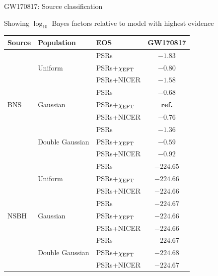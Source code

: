 \documentclass[usenames,dvipsnames,t]{beamer}
\begin{document}
\begin{frame}{GW170817: Source classification}

  Showing $\log_{10}$ Bayes factors relative to model with highest evidence

  \vspace{3mm}

  \begin{table}
    \centering
    \scriptsize
    \begin{tabular}{|l|l|l|c|}
    \hline
    \textbf{Source} & \textbf{Population} & \textbf{EOS} & \textbf{GW170817} \\
    \hline\hline
    \multirow{9}{*}{BNS} & \multirow{3}{*}{Uniform} & PSRs & \cellcolor{jeffreysred4}$-1.83$ \\
    \cline{3-4}
     &  & PSRs+$\chi_{\rm{EFT}}$ & \cellcolor{jeffreysred2}$-0.80$ \\
    \cline{3-4}
     &  & PSRs+NICER & \cellcolor{jeffreysred4}$-1.58$ \\
    \cline{2-4}
     & \multirow{3}{*}{Gaussian} & PSRs & \cellcolor{jeffreysred2}$-0.68$ \\
    \cline{3-4}
     &  & PSRs+$\chi_{\rm{EFT}}$ & \textbf{ref.} \\
    \cline{3-4}
     &  & PSRs+NICER & \cellcolor{jeffreysred2}$-0.76$ \\
    \cline{2-4}
     & \multirow{3}{*}{Double Gaussian} & PSRs & \cellcolor{jeffreysred3}$-1.36$ \\
    \cline{3-4}
     &  & PSRs+$\chi_{\rm{EFT}}$ & \cellcolor{jeffreysred2}$-0.59$ \\
    \cline{3-4}
     &  & PSRs+NICER & \cellcolor{jeffreysred2}$-0.92$ \\
    \hline\hline
    \multirow{9}{*}{NSBH} & \multirow{3}{*}{Uniform} & PSRs & \cellcolor{jeffreysred5}$-224.65$ \\
    \cline{3-4}
     &  & PSRs+$\chi_{\rm{EFT}}$ & \cellcolor{jeffreysred5}$-224.66$ \\
    \cline{3-4}
     &  & PSRs+NICER & \cellcolor{jeffreysred5}$-224.66$ \\
    \cline{2-4}
     & \multirow{3}{*}{Gaussian} & PSRs & \cellcolor{jeffreysred5}$-224.67$ \\
    \cline{3-4}
     &  & PSRs+$\chi_{\rm{EFT}}$ & \cellcolor{jeffreysred5}$-224.66$ \\
    \cline{3-4}
     &  & PSRs+NICER & \cellcolor{jeffreysred5}$-224.66$ \\
    \cline{2-4}
     & \multirow{3}{*}{Double Gaussian} & PSRs & \cellcolor{jeffreysred5}$-224.67$ \\
    \cline{3-4}
     &  & PSRs+$\chi_{\rm{EFT}}$ & \cellcolor{jeffreysred5}$-224.68$ \\
    \cline{3-4}
     &  & PSRs+NICER & \cellcolor{jeffreysred5}$-224.67$ \\
    \hline
    \end{tabular}
  \end{table}
\end{frame}
\end{document}
